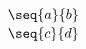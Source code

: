 \documentclass{article}
\begin{document}
\begin{equation}
\genfrac..{0pt}{}{\seq{a}{b}}{\seq{c}{d}}
\end{equation}
\end{document}
